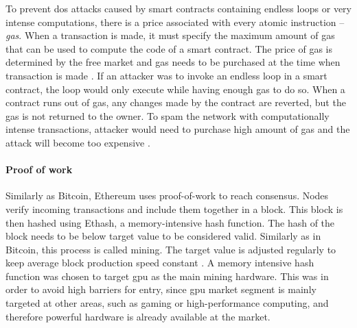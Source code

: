 To prevent \acrfull{dos} attacks caused by smart contracts containing endless loops or very intense computations, there is a price associated with every atomic instruction -- \textit{gas}. When a transaction is made, it must specify the maximum amount of gas that can be used to compute the code of a smart contract. The price of gas is determined by the free market and gas needs to be purchased at the time when transaction is made \cite{EthereumCommunityEthereumDocumentation}. If an attacker was to invoke an endless loop in a smart contract, the loop would only execute while having enough gas to do so. When a contract runs out of gas, any changes made by the contract are reverted, but the gas is not returned to the owner. To spam the network with computationally intense transactions, attacker would need to purchase high amount of gas and the attack will become too expensive \cite[p.5]{Atzei2017ASoK}.

\paragraph{Proof of work}
Similarly as Bitcoin, Ethereum uses proof-of-work to reach consensus. Nodes verify incoming transactions and include them together in a block. This block is then hashed using Ethash, a memory-intensive hash function. The hash of the block needs to be below target value to be considered valid. Similarly as in Bitcoin, this process is called mining. The target value is adjusted regularly to keep average block production speed constant \cite{Tikhomirov2018Ethereum:Perspectives}. A memory intensive hash function was chosen to target \acrshort{gpu} as the main mining hardware. This was in order to avoid high barriers for entry, since \acrshort{gpu} market segment is mainly targeted at other areas, such as gaming or high-performance computing, and therefore powerful hardware is already available at the market\footnotemark.
% 

